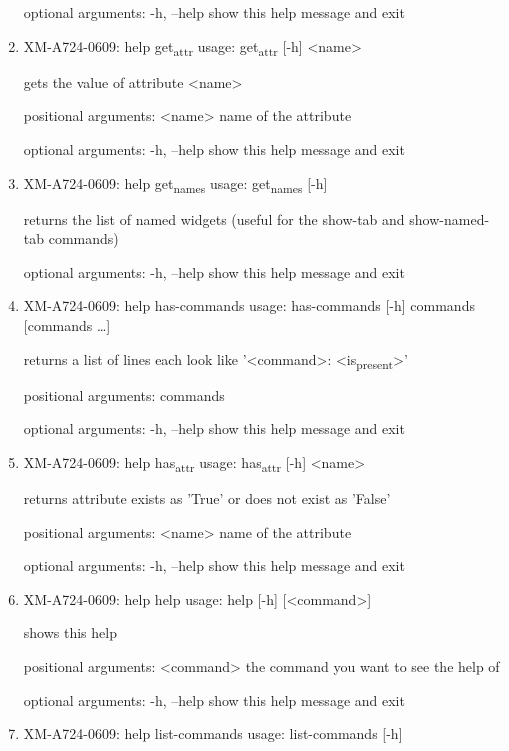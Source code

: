 \documentclass[11pt]{article}
\begin{document}
\begin{enumerate}
optional arguments:
  -h, --help  show this help message and exit

\item XM-A724-0609: help get\textsubscript{attr}
\label{sec:orge510629}
usage: get\textsubscript{attr} [-h] <name>

gets the value of attribute <name>

positional arguments:
  <name>      name of the attribute

optional arguments:
  -h, --help  show this help message and exit

\item XM-A724-0609: help get\textsubscript{names}
\label{sec:org6c2b199}
usage: get\textsubscript{names} [-h]

returns the list of named widgets (useful for the show-tab and show-named-tab
commands)

optional arguments:
  -h, --help  show this help message and exit

\item XM-A724-0609: help has-commands
\label{sec:org315e2d4}
usage: has-commands [-h] commands [commands \ldots{}]

returns a list of lines each look like '<command>: <is\textsubscript{present}>'

positional arguments:
  commands

optional arguments:
  -h, --help  show this help message and exit

\item XM-A724-0609: help has\textsubscript{attr}
\label{sec:org459a327}
usage: has\textsubscript{attr} [-h] <name>

returns attribute exists as 'True' or does not exist as 'False'

positional arguments:
  <name>      name of the attribute

optional arguments:
  -h, --help  show this help message and exit

\item XM-A724-0609: help help
\label{sec:orgcd102dc}
usage: help [-h] [<command>]

shows this help

positional arguments:
  <command>   the command you want to see the help of

optional arguments:
  -h, --help  show this help message and exit

\item XM-A724-0609: help list-commands
\label{sec:orga1bd123}
usage: list-commands [-h]


\end{enumerate}
\end{document}
